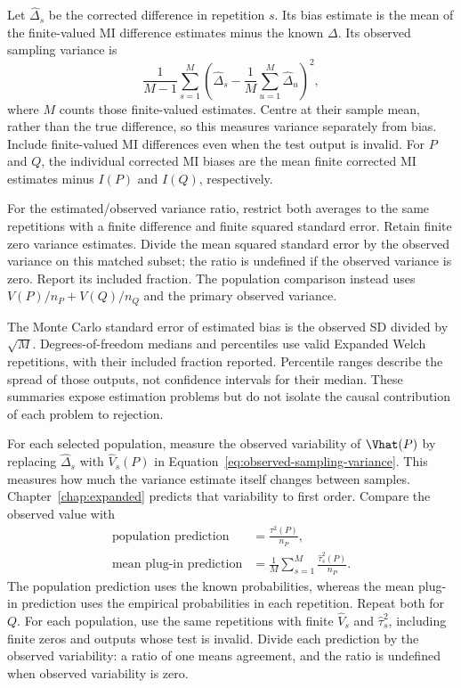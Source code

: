 Let \(\widehat\Delta_s\) be the corrected difference in repetition
\(s\). Its bias estimate is the mean of the finite-valued MI difference
estimates minus the known \(\Delta\). Its observed sampling variance is
\begin{equation}
 \frac{1}{M-1}\sum_{s=1}^M
 \left(\widehat\Delta_s-\frac{1}{M}\sum_{u=1}^M\widehat\Delta_u\right)^2,
 \label{eq:observed-sampling-variance}
\end{equation}
where \(M\) counts those finite-valued estimates. Centre at their sample
mean, rather than the true difference, so this measures variance
separately from bias. Include finite-valued MI differences even when the test
output is invalid. For \(P\) and \(Q\), the individual corrected MI biases
are the mean finite corrected MI estimates minus \(I(P)\) and \(I(Q)\),
respectively.

For the estimated/observed variance ratio, restrict both averages to
the same repetitions with a finite difference and finite squared
standard error. Retain finite zero variance estimates. Divide the mean
squared standard error by the observed variance on this matched subset;
the ratio is undefined if the observed variance is zero. Report its
included fraction. The population comparison instead uses
\(V(P)/n_P+V(Q)/n_Q\) and the primary observed variance.

The Monte Carlo standard error of estimated bias is the observed SD
divided by \(\sqrt M\). Degrees-of-freedom medians and percentiles
use valid Expanded Welch repetitions, with their included fraction
reported. Percentile ranges describe the spread of those outputs,
not confidence intervals for their median. These summaries expose
estimation problems but do not isolate the causal contribution of
each problem to rejection.

\medskip
{}

For each selected population, measure the observed variability of
\(\Vhat(P)\) by replacing \(\widehat\Delta_s\) with
\(\widehat V_s(P)\) in Equation~\eqref{eq:observed-sampling-variance}.
This measures how much the variance estimate itself changes between
samples. Chapter~\ref{chap:expanded} predicts that variability to first
order. Compare the observed value with
\begin{equation}
\begin{aligned}
 \text{population prediction}&=\frac{\tau^2(P)}{n_P},\\
 \text{mean plug-in prediction}&=
 \frac{1}{M}\sum_{s=1}^{M}\frac{\widehat\tau_s^2(P)}{n_P}.
\end{aligned}
 \label{eq:variance-stability-predictions}
\end{equation}
The population prediction uses the known probabilities, whereas the mean plug-in
prediction uses the empirical probabilities in each repetition. Repeat both for
\(Q\). For each population, use the same repetitions with finite
\(\widehat V_s\) and \(\widehat\tau_s^2\), including finite zeros
and outputs whose test is invalid. Divide each prediction by the observed
variability: a ratio of one means agreement, and the ratio is undefined
when observed variability is zero.

